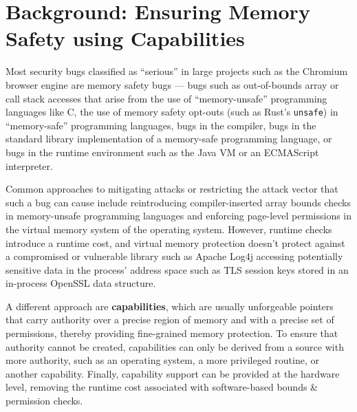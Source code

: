 \documentclass[main.tex]{subfiles}
\begin{document}
\onlyinsubfile{\mainmatter{}}

\chapter{Background: Ensuring Memory Safety using Capabilities} \label{ch:cheri}
Most security bugs classified as \enquote{serious} in large projects such as the Chromium browser engine \cite{chromium} are memory safety bugs — bugs such as out-of-bounds array or call stack accesses that arise from the use of \enquote{memory-unsafe} programming languages like C, the use of memory safety opt-outs (such as Rust’s \texttt{unsafe}) in \enquote{memory-safe} programming languages, bugs in the compiler, bugs in the standard library implementation of a memory-safe programming language, or bugs in the runtime environment such as the Java VM or an ECMAScript interpreter.

Common approaches to mitigating attacks or restricting the attack vector that such a bug can cause include reintroducing compiler-inserted array bounds checks in memory-unsafe programming languages and enforcing page-level permissions in the virtual memory system of the operating system. However, runtime checks introduce a runtime cost, and virtual memory protection doesn’t protect against a compromised or vulnerable library such as Apache Log4j accessing potentially sensitive data in the process’ address space such as TLS session keys stored in an in-process OpenSSL data structure.

A different approach are \textbf{capabilities}, which are usually unforgeable pointers that carry authority over a precise region of memory and with a precise set of permissions, thereby providing fine-grained memory protection. To ensure that authority cannot be created, capabilities can only be derived from a source with more authority, such as an operating system, a more privileged routine, or another capability. Finally, capability support can be provided at the hardware level, removing the runtime cost associated with software-based bounds \& permission checks.

\end{document}
